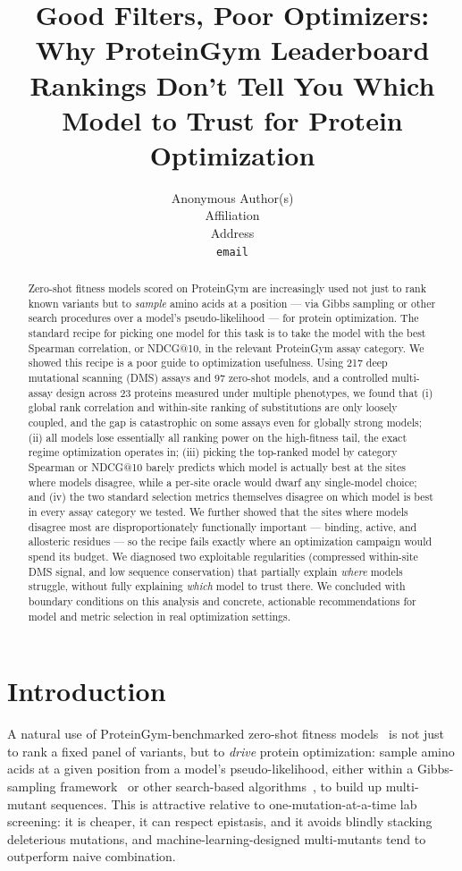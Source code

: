 \documentclass{article}
\title{Good Filters, Poor Optimizers: Why ProteinGym Leaderboard Rankings Don't Tell You Which Model to Trust for Protein Optimization}
\author{%
  Anonymous Author(s) \\
  Affiliation \\
  Address \\
  \texttt{email}
}
\begin{document}
\maketitle

\begin{abstract}
Zero-shot fitness models scored on ProteinGym are increasingly used not just to rank known variants but to \emph{sample} amino acids at a position --- via Gibbs sampling or other search procedures over a model's pseudo-likelihood --- for protein optimization. The standard recipe for picking one model for this task is to take the model with the best Spearman correlation, or NDCG@10, in the relevant ProteinGym assay category. We showed this recipe is a poor guide to optimization usefulness. Using 217 deep mutational scanning (DMS) assays and 97 zero-shot models, and a controlled multi-assay design across 23 proteins measured under multiple phenotypes, we found that (i) global rank correlation and within-site ranking of substitutions are only loosely coupled, and the gap is catastrophic on some assays even for globally strong models; (ii) all models lose essentially all ranking power on the high-fitness tail, the exact regime optimization operates in; (iii) picking the top-ranked model by category Spearman or NDCG@10 barely predicts which model is actually best at the sites where models disagree, while a per-site oracle would dwarf any single-model choice; and (iv) the two standard selection metrics themselves disagree on which model is best in every assay category we tested. We further showed that the sites where models disagree most are disproportionately functionally important --- binding, active, and allosteric residues --- so the recipe fails exactly where an optimization campaign would spend its budget. We diagnosed two exploitable regularities (compressed within-site DMS signal, and low sequence conservation) that partially explain \emph{where} models struggle, without fully explaining \emph{which} model to trust there. We concluded with boundary conditions on this analysis and concrete, actionable recommendations for model and metric selection in real optimization settings.
\end{abstract}

\section{Introduction}
\label{sec:intro}

A natural use of ProteinGym-benchmarked zero-shot fitness models~\citep{notin_proteingym_2023} is not just to rank a fixed panel of variants, but to \emph{drive} protein optimization: sample amino acids at a given position from a model's pseudo-likelihood, either within a Gibbs-sampling framework~\citep{spinner_unified_2026} or other search-based algorithms~\citep{mccarter_how_2026}, to build up multi-mutant sequences. This is attractive relative to one-mutation-at-a-time lab screening: it is cheaper, it can respect epistasis, and it avoids blindly stacking deleterious mutations, and machine-learning-designed multi-mutants tend to outperform naive combination.
\end{document}
